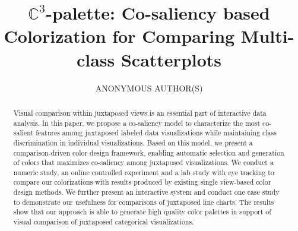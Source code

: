 \documentclass[manuscript,screen,review]{acmart}
\newcommand{\toolname}{$\mathbb{C}^3$}
\begin{document}
\graphicspath{{figures/}{pictures/}{images/}{./}} %
\title{\toolname-palette: Co-saliency based Colorization for Comparing Multi-class Scatterplots}
%
%
\author{ANONYMOUS AUTHOR(S)}
\renewcommand{\shortauthors}{Anon.}

\begin{abstract}
Visual comparison within juxtaposed views is an essential part of interactive data analysis. In this paper, we propose a co-saliency model to characterize the most co-salient features among juxtaposed labeled data visualizations while maintaining class discrimination in individual visualizations.
Based on this model, we present a comparison-driven color design framework, enabling automatic selection and generation of colors that maximizes co-saliency among juxtaposed visualizations. We conduct a numeric study, an online controlled experiment and a lab study with eye tracking to compare our colorizations with results produced by existing single view-based color design methods. We further present an interactive system and conduct one case study to demonstrate our usefulness for comparisons of juxtaposed line charts. The results show that our approach is able to generate high quality color palettes in support of visual comparison of juxtaposed categorical visualizations.

\end{abstract}
\end{document}

